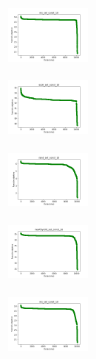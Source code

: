 \vspace*{\fill}
\newpage
\vspace*{\fill}

\begin{figure}[H]
    \centering
    \begin{subfigure}
        \centering
        \includegraphics[width=0.234\textwidth]{img/HS-LS-v2/iris_set_const_10_949004259_cost.png}
    \end{subfigure}
    \hfill
    \begin{subfigure}
        \centering
        \includegraphics[width=0.234\textwidth]{img/HS-LS-v2/ecoli_set_const_10_949004259_cost.png}
    \end{subfigure}
    \hfill
    \begin{subfigure}
        \centering
        \includegraphics[width=0.234\textwidth]{img/HS-LS-v2/rand_set_const_10_949004259_cost.png}
    \end{subfigure}
    \hfill
    \begin{subfigure}
        \centering
        \includegraphics[width=0.234\textwidth]{img/HS-LS-v2/newthyroid_set_const_10_949004259_cost.png}
    \end{subfigure}
    \hfill
    \begin{subfigure}
        \centering
        \includegraphics[width=0.234\textwidth]{img/HS-LS-v2/iris_set_const_10_589741062_cost.png}

\end{subfigure}
\end{figure}
